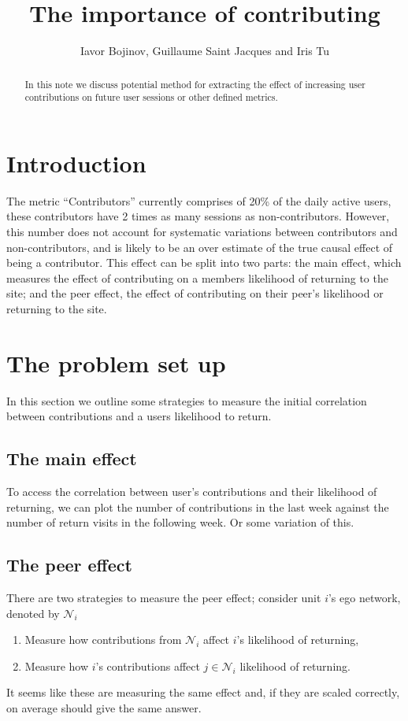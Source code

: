 \documentclass[a4paper]{article}
\title{The importance of contributing}
\author{Iavor Bojinov, Guillaume Saint Jacques and Iris Tu}
\begin{document}
\maketitle

\begin{abstract}
In this note we discuss potential method for extracting the effect of increasing user contributions on future user sessions or other defined metrics. 
\end{abstract}

\section{Introduction}
The metric ``Contributors'' currently comprises of 20\% of the daily active users, these contributors have 2 times as many sessions as non-contributors. However, this number does not account for systematic variations between contributors and non-contributors, and is likely to be an over estimate of the true causal effect of being a contributor. This effect can be split into two parts: the main effect, which measures the effect of contributing on a members likelihood of returning to the site; and the peer effect, the effect of contributing on their peer's likelihood or returning to the site. 


\section{The problem set up}
In this section we outline some strategies to measure the initial correlation between contributions and a users likelihood to return. 

\subsection{The main effect} %
\label{sub:the_main_effect}

To access the correlation between user's contributions and their likelihood of returning, we can plot the number of contributions in the last week against the number of return visits in the following week. Or some variation of this. 

\subsection{The peer effect} %
\label{sub:the_peer_effect}

There are two strategies to measure the peer effect; consider unit $i$'s ego network, denoted by $\mathcal{N}_i$
\begin{enumerate}
	\item Measure how contributions from $\mathcal{N}_i$ affect $i$'s likelihood of returning,
	\item Measure how $i$'s contributions affect $j \in \mathcal{N}_i$ likelihood of returning.
\end{enumerate}
It seems like these are measuring the same effect and, if they are scaled correctly, on average should give the same answer. 
\end{document}
